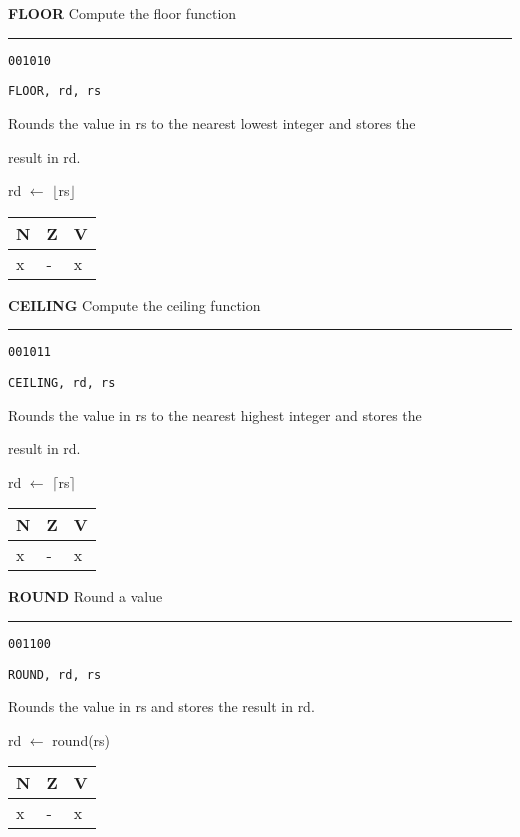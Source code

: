 \documentclass{article}
\begin{document}
\flushleft
\LARGE\textbf{FLOOR} \large \hfill Compute the floor function

\kern-3pt
\noindent\rule{16.5cm}{0.4pt}
\normalsize

{\large
	 \texttt{001010} \par
	\smallbreak
	 \texttt{FLOOR, rd, rs} \par
	\smallbreak
	 Rounds the value in rs to the nearest lowest integer and stores the \par
	\makebox[3.5cm][l]{  } result in rd. \par
	\smallbreak
	 rd $\leftarrow$ $\lfloor$rs$\rfloor$ \par
	\smallbreak
	 \begin{tabular}{lll} N \quad & Z \quad & V \\ \hline x & - & x \\ \end{tabular}
}

\pagebreak

\flushleft
\LARGE\textbf{CEILING} \large \hfill Compute the ceiling function

\kern-3pt
\noindent\rule{16.5cm}{0.4pt}
\normalsize

{\large
	 \texttt{001011} \par
	\smallbreak
	 \texttt{CEILING, rd, rs} \par
	\smallbreak
	 Rounds the value in rs to the nearest highest integer and stores the \par
	\makebox[3.5cm][l]{  } result in rd. \par
	\smallbreak
	 rd $\leftarrow$ $\lceil$rs$\rceil$ \par
	\smallbreak
	 \begin{tabular}{lll} N \quad & Z \quad & V \\ \hline x & - & x \\ \end{tabular}
}

\bigskip\bigskip

\flushleft
\LARGE\textbf{ROUND} \large \hfill Round a value

\kern-3pt
\noindent\rule{16.5cm}{0.4pt}
\normalsize

{\large
	 \texttt{001100} \par
	\smallbreak
	 \texttt{ROUND, rd, rs} \par
	\smallbreak
	 Rounds the value in rs and stores the result in rd. \par
	\smallbreak
	 rd $\leftarrow$ round(rs) \par
	\smallbreak
	 \begin{tabular}{lll} N \quad & Z \quad & V \\ \hline x & - & x \\ \end{tabular}
}
\end{document}
